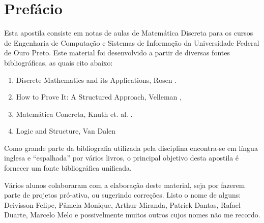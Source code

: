 \chapter*{Prefácio}

Esta apostila consiste em notas de aulas de Matemática Discreta para
os cursos de Engenharia de Computação e Sistemas de Informação da
Universidade Federal de Ouro Preto. Este material foi desenvolvido a
partir de diversas fontes bibliográficas, as quais cito abaixo:
\begin{enumerate}
  \item Discrete Mathematics and its Applications, Rosen \cite{Rosen02}.
  \item How to Prove It: A Structured Approach, Velleman
    \cite{Velleman06},
  \item Matemática Concreta, Knuth et. al. \cite{Graham94}.
  \item Logic and Structure, Van Dalen \cite{Dalen94}
\end{enumerate}

Como grande parte da bibliografia utilizada pela disciplina
encontra-se em língua inglesa e ``espalhada'' por vários livros,
o principal objetivo desta apostila é fornecer um fonte bibliográfica
unificada.

Vários alunos colaboraram com a elaboração deste material, seja por
fazerem parte de projetos pró-ativa, ou sugerindo correções. Listo o
nome de alguns: Deivisson Felipe, Pâmela Monique, Arthur
Miranda, Patrick Dantas, Rafael Duarte, Marcelo Melo e possivelmente
muitos outros cujos nomes não me recordo.